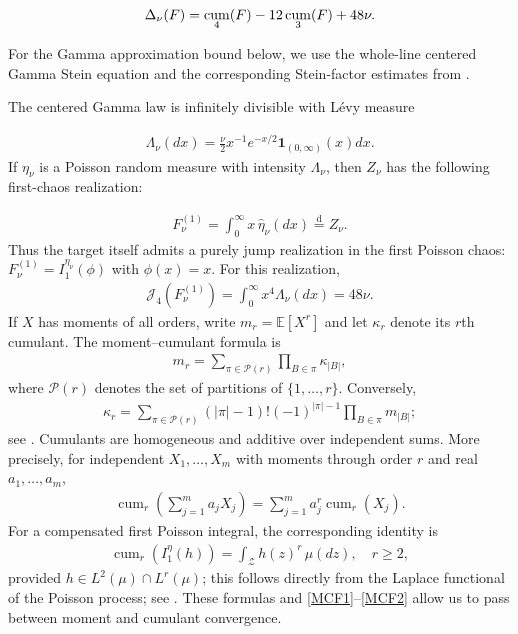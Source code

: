 \documentclass[letterpaper,11pt,reqno]{amsart}
\numberwithin{equation}{section}
\theoremstyle{plain}
\theoremstyle{definition}
\theoremstyle{remark}
\newcommand{\E}{\mathbb{E}}
\newcommand{\ind}{\mathbf{1}}
\newcommand{\cZ}{\mathcal{Z}}
\DeclareMathOperator{\cum}{cum}
\newcommand{\noi}{\noindent}
\newcommand{\dd}{d}
\newcommand{\Jfour}{\mathcal J_4}
\newcommand{\Del}{\Delta}
\begin{document}
\noi
\begin{align} 
 \Del_\nu(F)
 =\cum_4(F)-12\cum_3(F)+48\nu.
 \notag%
\end{align}

For the Gamma approximation bound below, we use the whole-line
centered Gamma Stein equation and the corresponding Stein-factor
estimates from \cite[Theorem~2.3]{DP18a}.

The centered Gamma law is infinitely divisible with L\'evy measure


\noi
\begin{align} \label{Lam_nu}
 \Lambda_\nu(\dd x)
 =\frac\nu2 x^{-1}e^{-x/2}
 \ind_{(0,\infty)}(x)\dd x.
\end{align}
If $\eta_\nu$ is a Poisson random measure with intensity
$\Lambda_\nu$, then $Z_\nu$ has the following first-chaos realization:


\noi
\begin{align*}
 F_\nu^{(1)}
 =\int_0^\infty x\,
 \widehat\eta_\nu(\dd x)
 \stackrel{\mathrm d}=Z_\nu.
\end{align*}
Thus the target itself admits a purely jump realization in the first
Poisson chaos: $F_\nu^{(1)}=I_1^{\eta_\nu}(\phi)$ with $\phi(x)=x$.
For this realization,
\noi
\begin{align*}
 \Jfour(F_\nu^{(1)})
 =\int_0^\infty x^4\Lambda_\nu(\dd x)
 =48\nu.
\end{align*}
If $X$ has moments of all orders, write $m_r=\E[X^r]$ and let
$\kappa_r$ denote its $r$th cumulant.
The moment--cumulant formula is
\begin{align}\label{MCF1}
 m_r
 =
 \sum_{\pi\in\mathcal P(r)}
 \prod_{B\in\pi}\kappa_{|B|},
\end{align}
where $\mathcal P(r)$ denotes the set of partitions of
$\{1,\ldots,r\}$.  Conversely,
\begin{align}\label{MCF2}
 \kappa_r
 =
 \sum_{\pi\in\mathcal P(r)}
 (|\pi|-1)!(-1)^{|\pi|-1}
 \prod_{B\in\pi}m_{|B|};
\end{align}
see \cite[Corollary~3.2.2]{PT11}.
Cumulants are homogeneous and additive over independent sums.
More precisely, for independent $X_1,\ldots,X_m$ with moments
through order $r$ and real $a_1,\ldots,a_m$,
\noi
\begin{align}
 \cum_r\left(\sum_{j=1}^m a_jX_j\right)
 =\sum_{j=1}^m a_j^r\cum_r(X_j).
 \label{cum_add}
\end{align}
For a compensated first Poisson integral, the corresponding
identity is
\noi
\begin{align}
 \cum_r(I_1^\eta(h))
 =\int_{\cZ}h(z)^r\,\mu(\dd z),
 \quad r\geq2,
 \label{cum_I1}
\end{align}
provided $h\in L^2(\mu)\cap L^r(\mu)$; this follows directly
from the Laplace functional of the Poisson process; see
\cite[Theorem~3.9]{LP18}.
These formulas and \eqref{MCF1}--\eqref{MCF2} allow us to pass
between moment and cumulant convergence.
\end{document}
